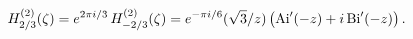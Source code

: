 \[\mathop{{H^{(2)}_{2/3}}\/}\nolimits\!\left(\zeta\right)=e^{2\pi i/3}\mathop{{H%
^{(2)}_{-2/3}}\/}\nolimits\!\left(\zeta\right)=e^{-\pi i/6}(\sqrt{3}/z)\left(%
\mathop{\mathrm{Ai}\/}\nolimits'\!\left(-z\right)+i\mathop{\mathrm{Bi}\/}%
\nolimits'\!\left(-z\right)\right).\]